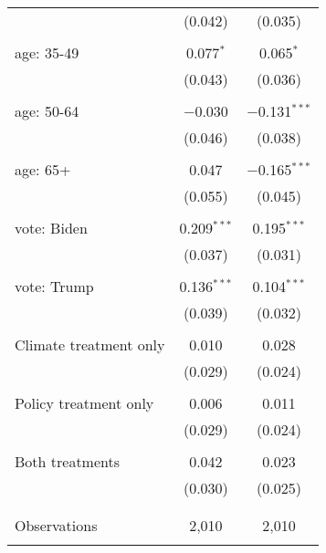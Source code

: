 \begin{tabular}{@{\extracolsep{5pt}}lcc}
  & (0.042) & (0.035) \\ 
  & & \\ 
 age: 35-49 & 0.077$^{*}$ & 0.065$^{*}$ \\ 
  & (0.043) & (0.036) \\ 
  & & \\ 
 age: 50-64 & $-$0.030 & $-$0.131$^{***}$ \\ 
  & (0.046) & (0.038) \\ 
  & & \\ 
 age: 65+ & 0.047 & $-$0.165$^{***}$ \\ 
  & (0.055) & (0.045) \\ 
  & & \\ 
 vote: Biden & 0.209$^{***}$ & 0.195$^{***}$ \\ 
  & (0.037) & (0.031) \\ 
  & & \\ 
 vote: Trump & 0.136$^{***}$ & 0.104$^{***}$ \\ 
  & (0.039) & (0.032) \\ 
  & & \\ 
 Climate treatment only & 0.010 & 0.028 \\ 
  & (0.029) & (0.024) \\ 
  & & \\ 
 Policy treatment only & 0.006 & 0.011 \\ 
  & (0.029) & (0.024) \\ 
  & & \\ 
 Both treatments & 0.042 & 0.023 \\ 
  & (0.030) & (0.025) \\ 
  & & \\ 
\hline \\[-1.8ex] 

Observations & 2,010 & 2,010 \\ 
\hline 
\hline \\[-1.8ex] 
\end{tabular} 